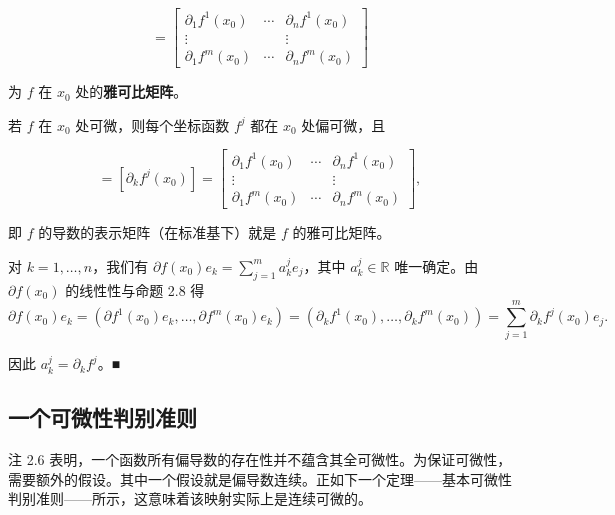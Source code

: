\begin{equation*}
[\partial_k f^j(x_0)] = \begin{bmatrix} \partial_1 f^1(x_0) & \cdots & \partial_n f^1(x_0) \\ \vdots & & \vdots \\ \partial_1 f^m(x_0) & \cdots & \partial_n f^m(x_0) \end{bmatrix}
\end{equation*}

为 $ f $ 在 $ x_0 $ 处的\textbf{雅可比矩阵}。

\begin{corollary}

若 $ f $ 在 $ x_0 $ 处可微，则每个坐标函数 $ f^j $ 都在 $ x_0 $ 处偏可微，且

\begin{equation*}
[\partial f(x_0)] = [\partial_k f^j(x_0)] = \begin{bmatrix} \partial_1 f^1(x_0) & \cdots & \partial_n f^1(x_0) \\ \vdots & & \vdots \\ \partial_1 f^m(x_0) & \cdots & \partial_n f^m(x_0) \end{bmatrix} ,
\end{equation*}

即 $ f $ 的导数的表示矩阵（在标准基下）就是 $ f $ 的雅可比矩阵。

\proofhead
对 $ k = 1, \ldots, n $，我们有 $ \partial f(x_0)e_k = \sum_{j=1}^{m} a_k^j e_j $，其中 $ a_k^j \in \mathbb{R} $ 唯一确定。由 $ \partial f(x_0) $ 的线性性与命题 2.8 得
\[
\partial f(x_0)e_k = (\partial f^1(x_0)e_k, \ldots, \partial f^m(x_0)e_k) = (\partial_k f^1(x_0), \ldots, \partial_k f^m(x_0)) = \sum_{j=1}^{m} \partial_k f^j(x_0) e_j .
\]

因此 $ a_k^j = \partial_k f^j $。\nobreak\hspace{0.35em}■

\end{corollary}

\subsection*{一个可微性判别准则}

注 2.6 表明，一个函数所有偏导数的存在性并不蕴含其全可微性。为保证可微性，需要额外的假设。其中一个假设就是偏导数连续。正如下一个定理——基本可微性判别准则——所示，这意味着该映射实际上是连续可微的。

